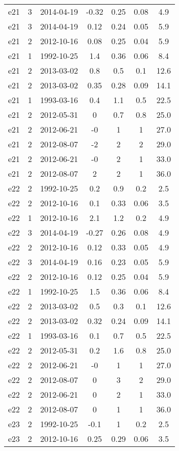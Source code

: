 \begin{table*}[htp]
\begin{tabular}{ccccccc}
e21 & 3 & 2014-04-19 & -0.32 & 0.25 & 0.08 & 4.9 \\
e21 & 3 & 2014-04-19 & 0.12 & 0.24 & 0.05 & 5.9 \\
e21 & 2 & 2012-10-16 & 0.08 & 0.25 & 0.04 & 5.9 \\
e21 & 1 & 1992-10-25 & 1.4 & 0.36 & 0.06 & 8.4 \\
e21 & 2 & 2013-03-02 & 0.8 & 0.5 & 0.1 & 12.6 \\
e21 & 2 & 2013-03-02 & 0.35 & 0.28 & 0.09 & 14.1 \\
e21 & 1 & 1993-03-16 & 0.4 & 1.1 & 0.5 & 22.5 \\
e21 & 2 & 2012-05-31 & 0 & 0.7 & 0.8 & 25.0 \\
e21 & 2 & 2012-06-21 & -0 & 1 & 1 & 27.0 \\
e21 & 2 & 2012-08-07 & -2 & 2 & 2 & 29.0 \\
e21 & 2 & 2012-06-21 & -0 & 2 & 1 & 33.0 \\
e21 & 2 & 2012-08-07 & 2 & 2 & 1 & 36.0 \\
e22 & 2 & 1992-10-25 & 0.2 & 0.9 & 0.2 & 2.5 \\
e22 & 2 & 2012-10-16 & 0.1 & 0.33 & 0.06 & 3.5 \\
e22 & 1 & 2012-10-16 & 2.1 & 1.2 & 0.2 & 4.9 \\
e22 & 3 & 2014-04-19 & -0.27 & 0.26 & 0.08 & 4.9 \\
e22 & 2 & 2012-10-16 & 0.12 & 0.33 & 0.05 & 4.9 \\
e22 & 3 & 2014-04-19 & 0.16 & 0.23 & 0.05 & 5.9 \\
e22 & 2 & 2012-10-16 & 0.12 & 0.25 & 0.04 & 5.9 \\
e22 & 1 & 1992-10-25 & 1.5 & 0.36 & 0.06 & 8.4 \\
e22 & 2 & 2013-03-02 & 0.5 & 0.3 & 0.1 & 12.6 \\
e22 & 2 & 2013-03-02 & 0.32 & 0.24 & 0.09 & 14.1 \\
e22 & 1 & 1993-03-16 & 0.1 & 0.7 & 0.5 & 22.5 \\
e22 & 2 & 2012-05-31 & 0.2 & 1.6 & 0.8 & 25.0 \\
e22 & 2 & 2012-06-21 & -0 & 1 & 1 & 27.0 \\
e22 & 2 & 2012-08-07 & 0 & 3 & 2 & 29.0 \\
e22 & 2 & 2012-06-21 & 0 & 2 & 1 & 33.0 \\
e22 & 2 & 2012-08-07 & 0 & 1 & 1 & 36.0 \\
e23 & 2 & 1992-10-25 & -0.1 & 1 & 0.2 & 2.5 \\
e23 & 2 & 2012-10-16 & 0.25 & 0.29 & 0.06 & 3.5 \\

\end{tabular}
\end{table*}
